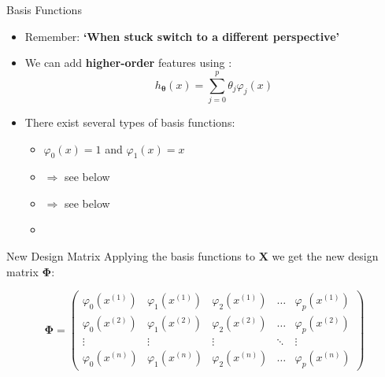 \begin{frame}{Basis Functions}{}
	\begin{itemize}
		\item Remember: \textbf{`When stuck switch to a different perspective'}
		\item We can add \textbf{higher-order} features using :
		\begin{equation}
			h_{\bm{\theta}}(x) = \sum_{j=0}^p \theta_j\varphi_j(x)
		\end{equation}
		\item There exist several types of basis functions:
		\begin{itemize}
			\item {} $\varphi_0(x) = 1$ and $\varphi_1(x) = x$
			\item {} $\Rightarrow$ see below
			\item {} $\Rightarrow$ see below
			\item {}
		\end{itemize}
	\end{itemize}
\end{frame}


\begin{frame}{New Design Matrix}{}
	Applying the basis functions to $\bm{X}$ we get the new design matrix $\bm{\Phi}$:
	
	\footnotesize
	\begin{equation}
		\bm{\Phi} =
		\begin{pmatrix}
			\varphi_0(x^{(1)}) 	& \varphi_1(x^{(1)}) 	& \varphi_2(x^{(1)}) 	& \hdots & \varphi_p(x^{(1)}) 	\\
			\varphi_0(x^{(2)}) 	& \varphi_1(x^{(2)}) 	& \varphi_2(x^{(2)}) 	& \hdots & \varphi_p(x^{(2)}) 	\\
			\vdots 			& \vdots 			& \vdots 			& \ddots & \vdots 			\\
			\varphi_0(x^{(n)}) 	& \varphi_1(x^{(n)}) 	& \varphi_2(x^{(n)}) 	& \hdots & \varphi_p(x^{(n)}) 
		\end{pmatrix}
	\end{equation}
	
	\vspace*{2mm}
	\begin{boxBlueNoFrame}
		\footnotesize
	\end{boxBlueNoFrame}
\end{frame}


